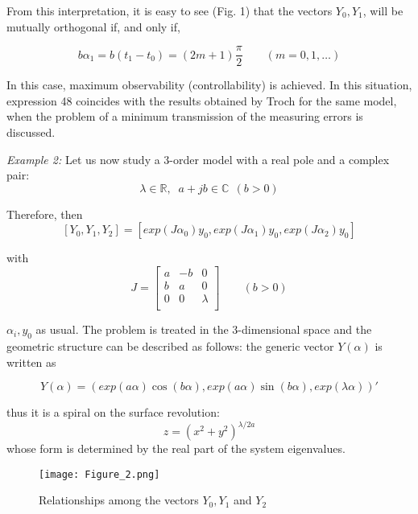 \documentclass{article}
\begin{document}
From this interpretation, it is easy to see (Fig. 1) that the vectors
$Y_0, Y_1$, will be mutually orthogonal if, and only if,

\begin{equation}\label{eq:48}
b\alpha_1 = b(t_1-t_0)= (2m+1) \frac{\pi}{2} \qquad (m=0, 1, \ldots )
\end{equation}

In this case, maximum observability (controllability) is achieved.
In this situation, expression 48 coincides with the results
obtained by Troch \cite{Troch} for the same model, when the
problem of a minimum transmission of the measuring errors is
discussed.

\textit{Example 2:} Let us now study a
3-order model with a real pole and a complex pair:
\begin{equation}\label{eq:49}
\lambda \in \mathbb{R}, \;\; a + jb \in \mathbb{C} \;\, (b > 0)
\end{equation}

Therefore,
then
\begin{equation}\label{eq:50}
[Y_0, Y_1, Y_2] = [exp (J\alpha_0)y_0, exp (J\alpha_1)y_0, exp (J\alpha_2)y_0]
\end{equation}

with
\begin{equation}\label{eq:51}
J = \left[
      \begin{array}{ccc}
        a & -b & 0 \\
        b & a & 0 \\
        0 & 0 & \lambda \\
      \end{array}
    \right]
\qquad (b>0)
\end{equation}

$\alpha_i, y_0$ as usual. The problem is treated in the 3-dimensional space and the
geometric structure can be described as follows: the generic
vector $Y(\alpha)$ is written as

\begin{equation}\label{eq:52}
Y(\alpha) = (exp (a\alpha)\cos (b\alpha), exp (a\alpha)\sin (b\alpha), exp(\lambda\alpha))'
\end{equation}

thus it is a spiral on the surface revolution:
\begin{equation}\label{eq:53}
z = (x^2 + y^2)^{\lambda / 2a}
\end{equation}
whose form is determined by the real part of
the system eigenvalues.


\begin{figure}
\begin{center}
\texttt{[image: Figure\_2.png]}
\caption{Relationships among the vectors $Y_0, Y_1$ and $Y_2$}
\label{figure:headings1}
\end{center}
\end{figure}
\end{document}

